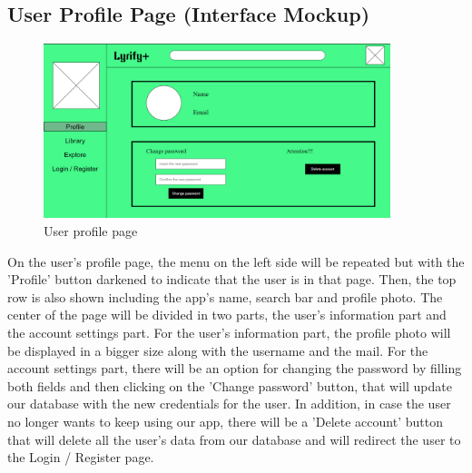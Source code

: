 \subsection{User Profile Page (Interface Mockup)}

\begin{figure}[h!]
\centering
\includegraphics[width=0.9\textwidth]{sections/PLL/ProfilePageMockup.png}
\caption{User profile page}
\end{figure}

On the user's profile page, the menu on the left side will be repeated but with the 'Profile' button darkened to indicate that the user is in that page. Then, the top row is also shown including the app's name, search bar and profile photo. The center of the page will be divided in two parts, the user's information part and the account settings part.
For the user's information part, the profile photo will be displayed in a bigger size along with the username and the mail.
For the account settings part, there will be an option for changing the password by filling both fields and then clicking on the 'Change password' button, that will update our database with the new credentials for the user. In addition, in case the user no longer wants to keep using our app, there will be a 'Delete account' button that will delete all the user's data from our database and will redirect the user to the Login / Register page. 